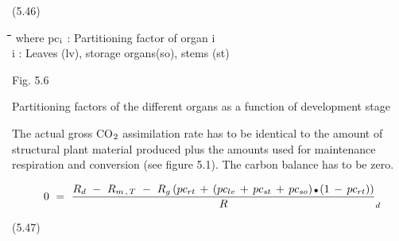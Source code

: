 \documentclass[11pt]{article}
\newcommand{\FigDir}{.}
\begin{document}
\bigskip
\strut\hfill (5.46)
\nwln
\begin{tabbing}
\hspace{1.27cm}\=\hspace{1.27cm}\=\hspace{1.27cm}\=\hspace{1.27cm}\=%
\hspace{1.27cm}\=\hspace{1.27cm}\=\hspace{1.27cm}\=\hspace{1.27cm}\=%
\hspace{1.27cm}\=\hspace{1.27cm}\=\kill
where\> pc$_{{\rm i}}$\> : Partitioning factor of organ i\> \> \> \> \> \> \> \> [kg kg$^{{\rm -1}}$]\\
\>i\> : Leaves (lv), storage organs(so), stems (st)
\end{tabbing}

 \bigskip
\begin{figure}[htbp]
\begin{forcewidth}{12.06cm}
 \begin{center}\InputPS{\FigDir/FRTB.eps} \end{center}
\end{forcewidth}
\end{figure}

\bigskip
\bigskip
\bigskip
\bigskip
\bigskip
\bigskip
\bigskip
\bigskip
\bigskip
\bigskip
\bigskip
\bigskip
\bigskip
Fig. 5.6
\testlastline

\begin{indenting}{2.54cm}
Parti\-tioning factors of the differ\-ent organs as a function of de\-velop\-ment
stage
\end{indenting}

\bigskip
\bigskip
The actual gross CO$_{{\rm 2}}$ assimilation rate has to be identical to the amount of structural plant
material produced plus the amounts used for maintenance respiration and conversion (see
figure 5.1). The carbon balance has to be zero. 

\begin{displaymath}
0~=~{\frac{R _{d} ~-~ R _{m\, ,\, T} ~-~ R _{g} \, (pc _{rt} \, +\, (pc _{lv} \, +\, pc _{st} \, +\, pc _{so} )\, {\rm \Bullet{0.75ex}}\, (1\, -\, pc _{rt} ))}{R}} _{d} 
\end{displaymath}

 \bigskip
\strut\hfill (5.47)
\end{document}
